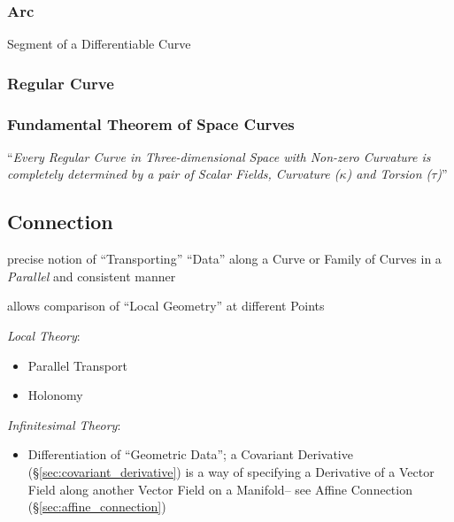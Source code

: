 \subsubsection{Arc}\label{sec:arc}

Segment of a Differentiable Curve



\subsubsection{Regular Curve}\label{sec:regular_curve}

\subsubsection{Fundamental Theorem of Space Curves}
\label{sec:fundamental_curve_theorem}

``\emph{Every Regular Curve in Three-dimensional Space with Non-zero
Curvature is completely determined by a pair of Scalar Fields, Curvature
($\kappa$) and Torsion ($\tau$)}''



\subsection{Connection}\label{sec:connection}

precise notion of ``Transporting'' ``Data'' along a Curve or Family of Curves
in a \emph{Parallel} and consistent manner

allows comparison of ``Local Geometry'' at different Points

\emph{Local Theory}:
\begin{itemize}
  \item Parallel Transport
  \item Holonomy
\end{itemize}

\emph{Infinitesimal Theory}:
\begin{itemize}
  \item Differentiation of ``Geometric Data''; a Covariant Derivative
    (\S\ref{sec:covariant_derivative}) is a way of specifying a Derivative of a
    Vector Field along another Vector Field on a Manifold-- see Affine
    Connection (\S\ref{sec:affine_connection})
\end{itemize}




